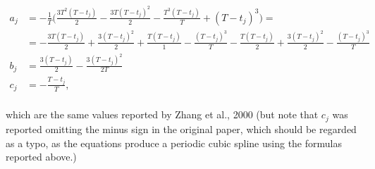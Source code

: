 \documentclass{article}
\begin{document}
\begin{align*}
a_j & = -\frac{1}{T} \bigl(  \frac{3T^2  (T-t_j) }{2} - \frac{3T (T-t_j)^2  }{2} -\frac{T^3(T-t_j)}{T}  + (T-t_j)^3 \bigr) = \\
 & = - \frac{3T(T-t_j) }{2} + \frac{3(T-t_j)^2  }{2} +\frac{T(T-t_j)}{1}  - \frac{(T-t_j)^3}{T} 
- \frac{T(T-t_j) }{2} + \frac{3(T-t_j)^2  }{2}  
 - \frac{(T-t_j)^3}{T} \\ 
b_j & = \frac{3(T-t_j) }{2} 
 -\frac{3   (T-t_j)^2  }{2T} \\
c_j & = -  \frac{T-t_j}{T}, \\
\end{align*}

which are the same values reported by Zhang et al., 2000 (but note that $c_j$ was reported omitting the minus sign in the original paper, which should be regarded as a typo, as the equations produce a periodic cubic spline using the formulas reported above.)
\end{document}
